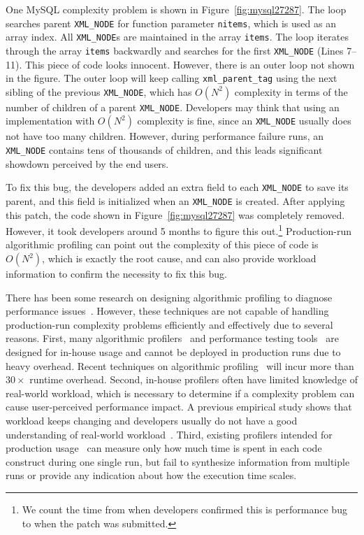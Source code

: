 


One MySQL complexity problem is shown in Figure~\ref{fig:mysql27287}.
The loop searches parent \texttt{XML\_NODE} for function parameter \texttt{nitems},
which is used as an array index. 
All \texttt{XML\_NODE}s are maintained in the array \texttt{items}.
The loop iterates through the array \texttt{items}
backwardly and searches for the first \texttt{XML\_NODE} (Lines 7--11).
This piece of code looks innocent.
However, there is an outer loop not shown in the figure.
The outer loop will keep calling \texttt{xml\_parent\_tag} using
the next sibling of the previous \texttt{XML\_NODE},
which has $O(N^2)$ complexity in terms of the number of children of a parent \texttt{XML\_NODE}.
Developers may think that using an implementation with $O(N^2)$ complexity is fine,
since an \texttt{XML\_NODE} usually does not have too many children.
However, during performance failure runs,
an \texttt{XML\_NODE} contains tens of thousands of children,
and this leads significant showdown perceived by the end users.

To fix this bug, the developers added an extra field to each \texttt{XML\_NODE} to save its parent,
and this field is initialized when an \texttt{XML\_NODE} is created.
After applying this patch, the code shown in Figure~\ref{fig:mysql27287} was completely removed.
However, it took developers around 5 months to figure this
out.\footnote{We count the time from when developers confirmed this is performance bug
to when the patch was submitted.}
Production-run algorithmic profiling 
can point out the complexity of this piece of code is $O(N^2)$, 
which is exactly the root cause, 
and can also provide workload information 
to confirm the necessity to fix this bug.


There has been some research on designing algorithmic profiling 
to diagnose performance issues~\cite{gprof,oprofile}. 
However, these techniques
are not capable of handling production-run complexity problems
efficiently and effectively due to several reasons. 
First, many algorithmic profilers~\cite{?} and performance 
testing tools~\cite{?} are designed for in-house usage and cannot be 
deployed in production runs due to  heavy overhead. 
Recent techniques on algorithmic 
profiling~\cite{Aprof1,Aprof2,AlgoProf} will incur more than $30\times$ runtime overhead.
Second, in-house profilers often have limited knowledge of real-world workload, which is necessary 
to determine if a complexity problem can cause user-perceived performance 
impact. A previous empirical study shows that workload keeps changing and 
developers usually do not have a good understanding of  real-world workload~\citep{PerfBug}.  
Third, existing profilers intended for production usage~\cite{?}
can measure only how much time 
is spent in each code construct during one single run,
but fail to synthesize information from multiple runs
or provide any indication about how the execution time scales.


